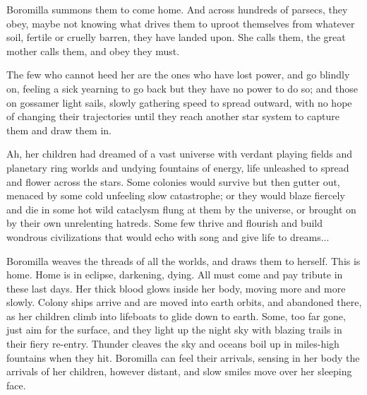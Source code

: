 Boromilla summons them to come home. And across hundreds of parsecs,
they obey, maybe not knowing what drives them to uproot themselves from
whatever soil, fertile or cruelly barren, they have landed upon. She
calls them, the great mother calls them, and obey they must.

The few who cannot heed her are the ones who have lost power, and go
blindly on, feeling a sick yearning to go back but they have no power to
do so; and those on gossamer light sails, slowly gathering speed to
spread outward, with no hope of changing their trajectories until they
reach another star system to capture them and draw them in.

Ah, her children had dreamed of a vast universe with verdant playing
fields and planetary ring worlds and undying fountains of energy, life
unleashed to spread and flower across the stars. Some colonies would
survive but then gutter out, menaced by some cold unfeeling slow
catastrophe; or they would blaze fiercely and die in some hot wild
cataclysm flung at them by the universe, or brought on by their own
unrelenting hatreds. Some few thrive and flourish and build wondrous
civilizations that would echo with song and give life to dreams...

Boromilla weaves the threads of all the worlds, and draws them to
herself. This is home. Home is in eclipse, darkening, dying. All must
come and pay tribute in these last days. Her thick blood glows inside
her body, moving more and more slowly. Colony ships arrive and are moved
into earth orbits, and abandoned there, as her children climb into
lifeboats to glide down to earth. Some, too far gone, just aim for the
surface, and they light up the night sky with blazing trails in their
fiery re-entry. Thunder cleaves the sky and oceans boil up in miles-high
fountains when they hit. Boromilla can feel their arrivals, sensing in
her body the arrivals of her children, however distant, and slow smiles
move over her sleeping face.
